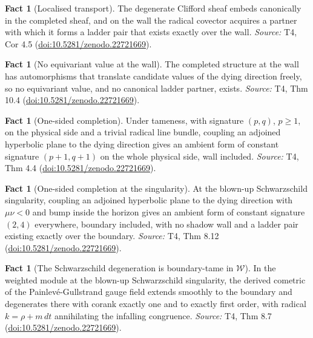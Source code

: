\documentclass[11pt]{article}
\theoremstyle{definition}
\newtheorem{fact}[theorem]{Fact}
\theoremstyle{plain}
\newcommand{\changedmark}[2]{\marginpar{\raggedright\scriptsize\color{#1}#2}}
\providecommand{\dtPG}{}\renewcommand{\dtPG}{dt}
\providecommand{\shW}{}\renewcommand{\shW}{\mathcal{W}}
\begin{document}
\begin{fact}[Localised transport]\label{c:sheaf.localised-transport}
The degenerate Clifford sheaf embeds canonically in the completed sheaf, and on the wall the radical covector acquires a partner with which it forms a ladder pair that exists exactly over the wall.
\emph{Source:} T4, Cor 4.5 (\href{https://doi.org/10.5281/zenodo.22721669}{doi:10.5281/zenodo.22721669}).
\end{fact}

\begin{fact}[No equivariant value at the wall]\label{c:sheaf.no-equivariant-value-wall}
The completed structure at the wall has automorphisms that translate candidate values of the dying direction freely, so no equivariant value, and no canonical ladder partner, exists.
\emph{Source:} T4, Thm 10.4 (\href{https://doi.org/10.5281/zenodo.22721669}{doi:10.5281/zenodo.22721669}).
\end{fact}

\begin{fact}[One-sided completion]\label{c:sheaf.one-sided-completion}
Under tameness, with signature $(p,q)$, $p \geq 1$, on the physical side and a trivial radical line bundle, coupling an adjoined hyperbolic plane to the dying direction gives an ambient form of constant signature $(p{+}1, q{+}1)$ on the whole physical side, wall included.
\emph{Source:} T4, Thm 4.4 (\href{https://doi.org/10.5281/zenodo.22721669}{doi:10.5281/zenodo.22721669}).
\end{fact}

\begin{fact}[One-sided completion at the singularity]\label{c:sheaf.one-sided-completion-singularity}
At the blown-up Schwarzschild singularity, coupling an adjoined hyperbolic plane to the dying direction with $\mu\nu < 0$ and bump inside the horizon gives an ambient form of constant signature $(2,4)$ everywhere, boundary included, with no shadow wall and a ladder pair existing exactly over the boundary.
\emph{Source:} T4, Thm 8.12 (\href{https://doi.org/10.5281/zenodo.22721669}{doi:10.5281/zenodo.22721669}).
\end{fact}

\begin{fact}[The Schwarzschild degeneration is boundary-tame in $\shW$]\label{c:sheaf.schwarzschild-degeneration-boundary-tame}
\changedmark{gray}{reworded}
In the weighted module at the blown-up Schwarzschild singularity, the derived cometric of the Painlev\'e-Gullstrand gauge field extends smoothly to the boundary and degenerates there with corank exactly one and to exactly first order, with radical $k = \rho + m\,\dtPG$ annihilating the infalling congruence.
\emph{Source:} T4, Thm 8.7 (\href{https://doi.org/10.5281/zenodo.22721669}{doi:10.5281/zenodo.22721669}).
\end{fact}
\end{document}
